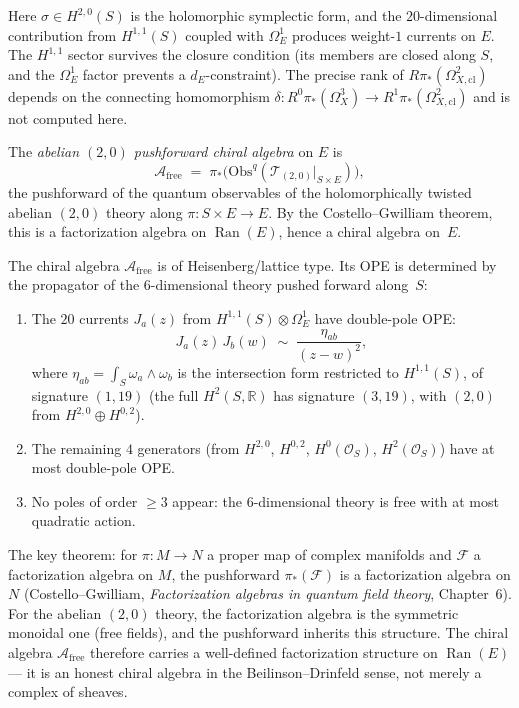 \documentclass[11pt]{article}
\newcommand{\cA}{\mathcal{A}}
\newcommand{\cF}{\mathcal{F}}
\newcommand{\cO}{\mathcal{O}}
\newcommand{\R}{\mathbb{R}}
\newcommand{\Ran}{\operatorname{Ran}}
\begin{document}
\noindent Here $\sigma \in H^{2,0}(S)$ is the holomorphic symplectic form, and the $20$-dimensional contribution from $H^{1,1}(S)$ coupled with $\Omega^1_E$ produces weight-$1$ currents on $E$. The $H^{1,1}$ sector survives the closure condition (its members are closed along $S$, and the $\Omega^1_E$ factor prevents a $d_E$-constraint). The precise rank of $R\pi_*(\Omega^2_{X,\mathrm{cl}})$ depends on the connecting homomorphism $\delta \colon R^0\pi_*(\Omega^3_X) \to R^1\pi_*(\Omega^2_{X,\mathrm{cl}})$ and is not computed here.

\begin{definition}
\label{def:pushforward-chiral-algebra}
The \emph{abelian $(2,0)$ pushforward chiral algebra} on $E$ is
\[
 \cA_{\mathrm{free}} \;=\; \pi_*\bigl(\mathrm{Obs}^q(\mathcal{T}_{(2,0)}|_{S \times E})\bigr),
\]
the pushforward of the quantum observables of the holomorphically twisted abelian $(2,0)$ theory along $\pi \colon S \times E \to E$. By the Costello--Gwilliam theorem, this is a factorization algebra on $\Ran(E)$, hence a chiral algebra on~$E$.
\end{definition}

\begin{proposition}[OPE structure of $\cA_{\mathrm{free}}$]
\label{prop:pushforward-ope}
The chiral algebra $\cA_{\mathrm{free}}$ is of Heisenberg/lattice type. Its OPE is determined by the propagator of the $6$-dimensional theory pushed forward along~$S$:
\begin{enumerate}[label=\textup{(\roman*)}]
 \item The $20$ currents $J_a(z)$ from $H^{1,1}(S) \otimes \Omega^1_E$ have double-pole OPE:
 \[
 J_a(z)\, J_b(w) \;\sim\; \frac{\eta_{ab}}{(z-w)^2},
 \]
 where $\eta_{ab} = \int_S \omega_a \wedge \omega_b$ is the intersection form restricted to $H^{1,1}(S)$, of signature $(1,19)$ (the full $H^2(S,\R)$ has signature $(3,19)$, with $(2,0)$ from $H^{2,0} \oplus H^{0,2}$).
 \item The remaining $4$ generators (from $H^{2,0}$, $H^{0,2}$, $H^0(\cO_S)$, $H^2(\cO_S)$) have at most double-pole OPE.
 \item No poles of order $\geq 3$ appear: the $6$-dimensional theory is free with at most quadratic action.
\end{enumerate}
\end{proposition}

\begin{remark}
\label{rem:cg-pushforward}
The key theorem: for $\pi \colon M \to N$ a proper map of complex manifolds and $\cF$ a factorization algebra on $M$, the pushforward $\pi_*(\cF)$ is a factorization algebra on $N$ (Costello--Gwilliam, \emph{Factorization algebras in quantum field theory}, Chapter~6). For the abelian $(2,0)$ theory, the factorization algebra is the symmetric monoidal one (free fields), and the pushforward inherits this structure. The chiral algebra $\cA_{\mathrm{free}}$ therefore carries a well-defined factorization structure on $\Ran(E)$ --- it is an honest chiral algebra in the Beilinson--Drinfeld sense, not merely a complex of sheaves.
\end{remark}
\end{document}
